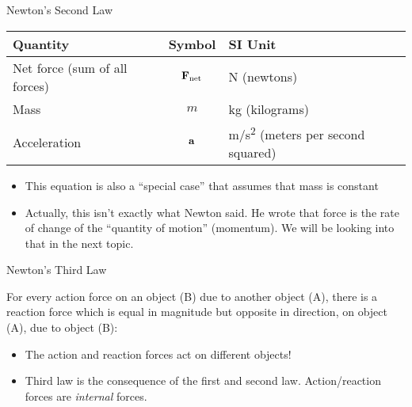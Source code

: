 \documentclass[12pt,compress,aspectratio=169]{beamer}
\newcommand{\mb}[1]{\ensuremath\mathbf{#1}}
\newcommand{\eq}[2]{\vspace{#1}{\Large\begin{displaymath}#2\end{displaymath}}}
\begin{document}
\begin{frame}{Newton's Second Law}
  \begin{center}
  \end{center}

  \eq{-.2in}{
    \boxed{\mb{F}_{\textrm{net}}=\Sigma\mb{F}=m\mb{a}}
  }
  \begin{center}
    \begin{tabular}{l|c|l}
      \rowcolor{pink}
      \textbf{Quantity} & \textbf{Symbol} & \textbf{SI Unit} \\ \hline
      Net force (sum of all forces)  & $\mb{F}_{\textrm{net}}$ &
      \si{N} (newtons)\\
      Mass         & $m$       & \si{kg} (kilograms) \\
      Acceleration & $\mb{a}$  & \si{m/s^2} (meters per second squared) \\
    \end{tabular}
  \end{center}
  \begin{itemize}
  \item\vspace{-.1in}\textcolor{red!80!black}{This equation is also a
    ``special case'' that assumes that mass is constant}
  \item Actually, this isn't exactly what Newton said. He wrote that force is
    the rate of change of the ``quantity of motion'' (momentum). We will be
    looking into that in the next topic.
  \end{itemize}
\end{frame}


\begin{frame}{Newton's Third Law}

  \begin{center}
  \end{center}
 
  For every action force on an object (B) due to another object (A), there is a
  reaction force which is equal in magnitude but opposite in direction, on
  object (A), due to object (B):

  \eq{-.3in}{
    \boxed{\mb{F}_{\textrm{A on B}} = -\mb{F}_{\textrm{B on A}}}
  }
  \begin{itemize}
  \item The action and reaction forces act on different objects!
  \item Third law is the consequence of the first and second law.
    Action/reaction forces are \emph{internal} forces.
  \end{itemize}
\end{frame}
\end{document}
